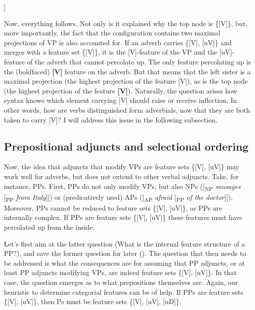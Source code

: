 \documentclass[output=paper
,modfonts
,nonflat]{langsci/langscibook}
\begin{document}
	\begin{exe}
\ex \begin{forest}	
				[\{\textbf{{[}{V}{]}}\}
				[\{{[}V{]}\}]
				[\{\textbf{{[}{V}{]}}{,} {[}uV{]}\}] ]
		\end{forest}
	\end{exe}
\noindent Now, everything follows. Not only is it explained why the top node is \{[V]\}, but, more importantly, the fact that the configuration contains two maximal projections of VP is also accounted for. If an adverb carries \{[V], [uV]\} and merges with a feature set \{[V]\}, it is the [V]-feature of the VP and the [uV]-feature of the adverb that cannot percolate up. The only feature percolating up is the (boldfaced) \textbf{[V]} feature on the adverb. But that means that the left sister is a maximal projection (the highest projection of the feature [V]), as is the top node (the highest projection of the feature \textbf{[V]}). Naturally, the question arises how syntax knows which element carrying [V] should raise or receive inflection. In other words, how are verbs distinguished form adverbials, now that they are both taken to carry [V]? I will address this issue in the following subsection.

\subsection{Prepositional adjuncts and selectional ordering} \label{sec-zeijlstra:3.3}
Now, the idea that adjuncts that modify VPs are feature sets \{[V], [uV]\} may work well for adverbs, but does not extend to other verbal adjuncts. Take, for instance, PPs. First, PPs do not only modify VPs, but also NPs ([\textsubscript{NP} \textit{sausages} [\textsubscript{PP} \textit{from Italy}]]) or (predicatively used) APs ([\textsubscript{AP} \textit{afraid} [\textsubscript{PP} \textit{of the doctor}]]). Moreover, PPs cannot be reduced to feature sets \{[V], [uV]\}, as PPs are internally complex. If PPs are feature sets \{[V], [uV]\} these features must have percolated up from the inside.

Let’s first aim at the latter question (What is the internal feature structure of a PP?), and save the former question for later (). The question that then needs to be addressed is what the consequences are for assuming that PP adjuncts, or at least PP adjuncts modifying VPs, are indeed feature sets \{[V], [uV]\}. In that case, the question emerges as to what prepositions themselves are. Again, our heuristic to determine categorial features can be of help. If PPs are feature sets \{[V], [uV]\}, then Ps must be feature sets \{[V], [uV], [uD]\}.
\end{document}
